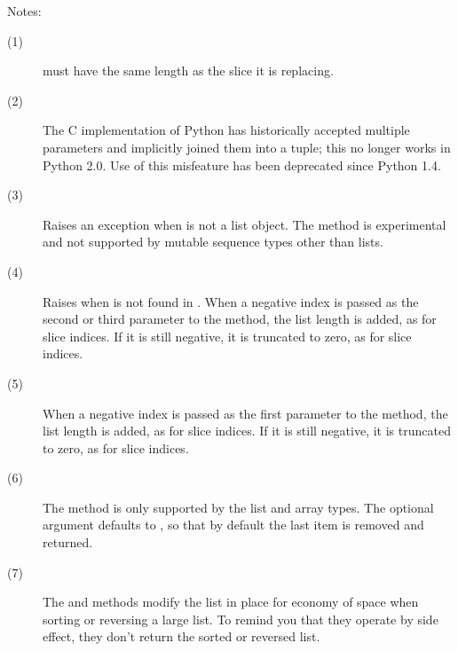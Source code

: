 \noindent
Notes:
\begin{description}
\item[(1)]  must have the same length as the slice it is 
  replacing.

\item[(2)] The C implementation of Python has historically accepted
  multiple parameters and implicitly joined them into a tuple; this
  no longer works in Python 2.0.  Use of this misfeature has been
  deprecated since Python 1.4.

\item[(3)] Raises an exception when  is not a list object.  The
   method is experimental and not supported by
  mutable sequence types other than lists.

\item[(4)] Raises  when  is not found in
  . When a negative index is passed as the second or third parameter
  to the  method, the list length is added, as for slice
  indices.  If it is still negative, it is truncated to zero, as for
  slice indices.  

\item[(5)] When a negative index is passed as the first parameter to
  the  method, the list length is added, as for slice
  indices.  If it is still negative, it is truncated to zero, as for
  slice indices.  

\item[(6)] The  method is only supported by the list and
  array types.  The optional argument  defaults to ,
  so that by default the last item is removed and returned.

\item[(7)] The  and  methods modify the
  list in place for economy of space when sorting or reversing a large
  list.  To remind you that they operate by side effect, they don't return
  the sorted or reversed list.


\end{description}
